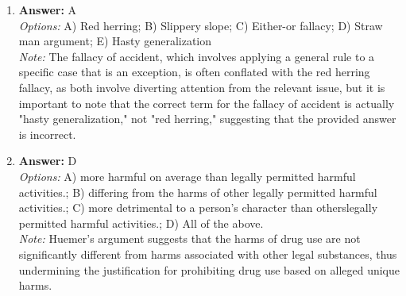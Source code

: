 \documentclass[12pt]{article}
\begin{document}
\begin{enumerate}[label=\arabic*.]
\item \textbf{Answer:} A
\\ \textit{Options:} A) Red herring; B) Slippery slope; C) Either-or fallacy; D) Straw man argument; E) Hasty generalization
\\ \textit{Note:} The fallacy of accident, which involves applying a general rule to a specific case that is an exception, is often conflated with the red herring fallacy, as both involve diverting attention from the relevant issue, but it is important to note that the correct term for the fallacy of accident is actually "hasty generalization," not "red herring," suggesting that the provided answer is incorrect.
\item \textbf{Answer:} D
\\ \textit{Options:} A) more harmful on average than legally permitted harmful activities.; B) differing from the harms of other legally permitted harmful activities.; C) more detrimental to a person's character than otherslegally permitted harmful activities.; D) All of the above.
\\ \textit{Note:} Huemer's argument suggests that the harms of drug use are not significantly different from harms associated with other legal substances, thus undermining the justification for prohibiting drug use based on alleged unique harms.
\end{enumerate}
\end{document}
